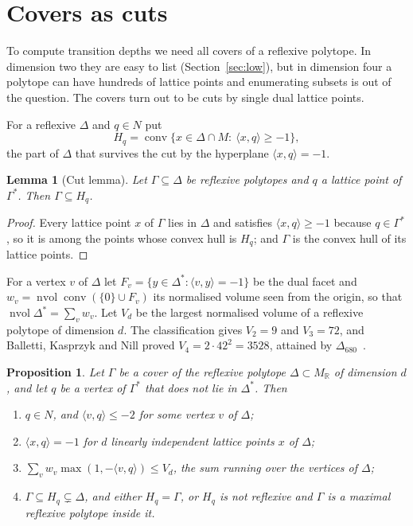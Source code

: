 \documentclass[11pt]{amsart}
\newtheorem{lemma}[theorem]{Lemma}
\newtheorem{proposition}[theorem]{Proposition}
\theoremstyle{definition}
\theoremstyle{remark}
\newcommand{\R}{\mathbb{R}}
\newcommand{\ip}[2]{\langle #1,#2\rangle}
\newcommand{\conv}{\operatorname{conv}}
\newcommand{\nvol}{\operatorname{nvol}}
\newcommand{\Dbig}{\Delta_{680}}
\begin{document}
\section{Covers as cuts}\label{sec:cuts}

To compute transition depths we need all covers of a reflexive polytope.
In dimension two they are easy to list (Section~\ref{sec:low}), but in
dimension four a polytope can have hundreds of lattice points and
enumerating subsets is out of the question. The covers turn out to be cuts
by single dual lattice points.

For a reflexive $\Delta$ and $q\in N$ put
\[
H_q=\conv\{x\in\Delta\cap M:\ \ip{x}{q}\ge-1\},
\]
the part of $\Delta$ that survives the cut by the hyperplane
$\ip{x}{q}=-1$.

\begin{lemma}[Cut lemma]\label{lem:cut}
Let $\Gamma\subseteq\Delta$ be reflexive polytopes and $q$ a lattice point
of $\Gamma^*$. Then $\Gamma\subseteq H_q$.
\end{lemma}

\begin{proof}
Every lattice point $x$ of $\Gamma$ lies in $\Delta$ and satisfies
$\ip{x}{q}\ge-1$ because $q\in\Gamma^*$, so it is among the points whose
convex hull is $H_q$; and $\Gamma$ is the convex hull of its lattice
points.
\end{proof}

For a vertex $v$ of $\Delta$ let $F_v=\{y\in\Delta^*:\ip{v}{y}=-1\}$ be the
dual facet and $w_v=\nvol\conv(\{0\}\cup F_v)$ its normalised volume seen
from the origin, so that $\nvol\Delta^*=\sum_v w_v$. Let $V_d$ be the
largest normalised volume of a reflexive polytope of dimension $d$. The
classification gives $V_2=9$ and $V_3=72$, and Balletti, Kasprzyk and Nill
proved $V_4=2\cdot42^2=3528$, attained by $\Dbig$~\cite{BKN22}.

\begin{proposition}\label{prop:cuts}
Let $\Gamma$ be a cover of the reflexive polytope $\Delta\subset M_\R$ of
dimension $d$, and let $q$ be a vertex of $\Gamma^*$ that does not lie in
$\Delta^*$. Then
\begin{enumerate}[label=\textup{(\alph*)},leftmargin=*]
\item $q\in N$, and $\ip{v}{q}\le-2$ for some vertex $v$ of $\Delta$;
\item $\ip{x}{q}=-1$ for $d$ linearly independent lattice points $x$ of
$\Delta$;
\item $\sum_v w_v\max(1,-\ip{v}{q})\le V_d$, the sum running over the
vertices of $\Delta$;
\item $\Gamma\subseteq H_q\subsetneq\Delta$, and either $H_q=\Gamma$, or
$H_q$ is not reflexive and $\Gamma$ is a maximal reflexive polytope inside
it.
\end{enumerate}
\end{proposition}
\end{document}

